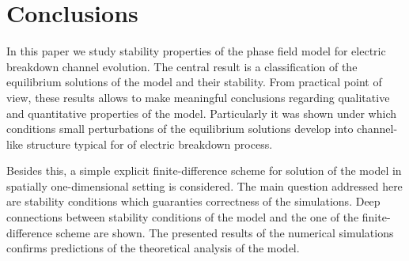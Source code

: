 
\section{Conclusions}

In this paper we study stability properties of the phase field model
for electric breakdown channel evolution.
The central result is a classification of the
equilibrium solutions of the model and their stability.
From practical point of view, these results allows to
make meaningful conclusions regarding qualitative and quantitative
properties of the model. Particularly it was shown under which
conditions small perturbations of the equilibrium solutions
develop into channel-like structure typical for of electric breakdown
process.

Besides this, a simple explicit finite-difference scheme
for solution of the model in spatially one-dimensional setting is considered.
The main question addressed here are stability conditions which guaranties
correctness of the simulations. Deep connections between
stability conditions of the model and the one of the
finite-difference scheme are shown.
The presented results of the numerical simulations confirms
predictions of the theoretical analysis of the model.

\endinput